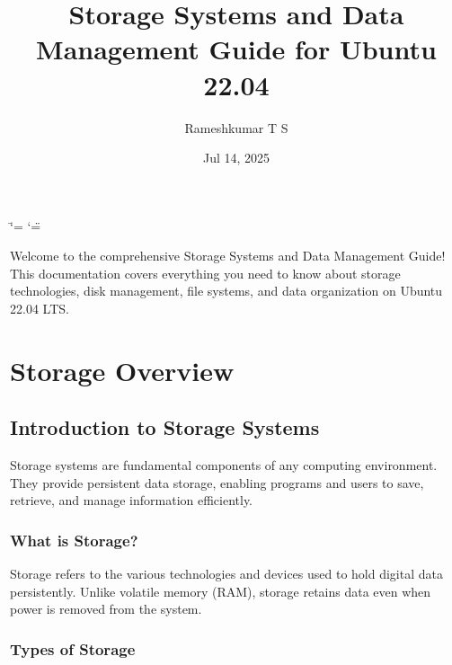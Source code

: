 \documentclass[letterpaper,10pt,english]{sphinxmanual}
\title{Storage Systems and Data Management Guide for Ubuntu 22.04}
\date{Jul 14, 2025}
\author{Rameshkumar T S}
\begin{document}
\ifdefined\shorthandoff
  \ifnum\catcode`\=\string=\active\shorthandoff{=}\fi
  \ifnum\catcode`\"=\active{}\fi
\fi

\pagestyle{empty}
\sphinxmaketitle
\pagestyle{plain}
\sphinxtableofcontents
\pagestyle{normal}
\label{\detokenize{index::doc}}


\sphinxAtStartPar
Welcome to the comprehensive Storage Systems and Data Management Guide! This documentation covers everything you need to know about storage technologies, disk management, file systems, and data organization on Ubuntu 22.04 LTS.

\sphinxstepscope


\chapter{Storage Overview}
\label{\detokenize{storage-overview:storage-overview}}\label{\detokenize{storage-overview::doc}}

\section{Introduction to Storage Systems}
\label{\detokenize{storage-overview:introduction-to-storage-systems}}
\sphinxAtStartPar
Storage systems are fundamental components of any computing environment. They provide persistent data storage, enabling programs and users to save, retrieve, and manage information efficiently.


\subsection{What is Storage?}
\label{\detokenize{storage-overview:what-is-storage}}
\sphinxAtStartPar
Storage refers to the various technologies and devices used to hold digital data persistently. Unlike volatile memory (RAM), storage retains data even when power is removed from the system.


\subsection{Types of Storage}
\label{\detokenize{storage-overview:types-of-storage}}
\end{document}
